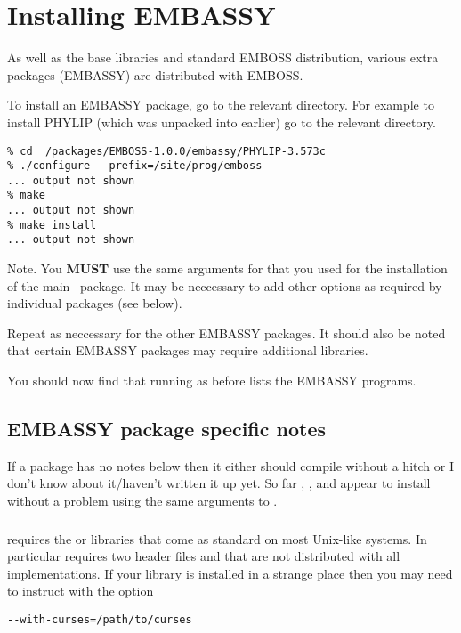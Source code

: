 \documentclass{report}
\begin{document}
\section{Installing EMBASSY}

As well as the base libraries and standard EMBOSS distribution, various extra packages (EMBASSY) are distributed with EMBOSS.

To install an EMBASSY package, go to the relevant directory. For example to install PHYLIP (which was unpacked into  earlier) go to the relevant directory.
\begin{verbatim}
% cd  /packages/EMBOSS-1.0.0/embassy/PHYLIP-3.573c
% ./configure --prefix=/site/prog/emboss
... output not shown
% make
... output not shown
% make install
... output not shown
\end{verbatim}

Note. You {\bf MUST} use the same arguments for  that you used for the installation of the main \EMBOSS\ package. It may be neccessary to add other options as required by individual packages (see below).

Repeat as neccessary for the other EMBASSY packages. It should also be noted that certain EMBASSY packages may require additional libraries.
 
You should now find that running  as before lists the EMBASSY programs.

\subsection{EMBASSY package specific notes}

If a package has no notes below then it either should compile without a hitch 
or I don't know about it/haven't written it up yet. So far , 
,  and  appear to install 
without a problem using the same arguments to . 

\subsubsection{}

 requires the  or  libraries 
that come as standard on most Unix-like systems. In particular  
requires two header files  and  that are not 
distributed with all implementations. If your  
library is installed in a strange place then you may need to instruct 
 with the option 
\begin{verbatim}
--with-curses=/path/to/curses
\end{verbatim}
\end{document}
